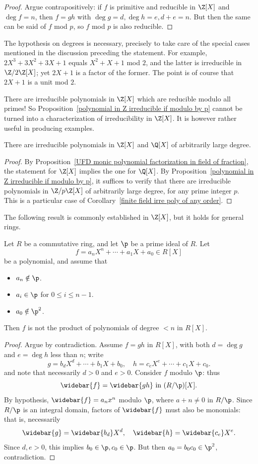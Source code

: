\begin{proof}
Argue contrapositively: if $f$ is primitive and reducible in $\Z[X]$ and $\deg f=n$, then $f=gh$ with $\deg g=d,\deg h=e,d+e=n$. But then the same can be said of $f$ mod $p$, so $f$ mod $p$ is also reducible.
\end{proof}
The hypothesis on degrees is necessary, precisely to take care of the special cases mentioned in the discussion preceding the statement. For example, $2X^3+3X^2+3X+1$ equals $X^2+X+1$ mod $2$, and the latter is irreducible in $\Z/2\Z[X]$; yet $2X+1$ is a factor of the former. The point is of course that $2X+1$ is a unit mod $2$.
\begin{remark}
There are irreducible polynomials in $\Z[X]$ which are reducible modulo all primes! So Proposition~\ref{polynomial in Z irreducible if modulo by p} cannot be turned into a characterization of irreducibility in $\Z[X]$. It is however rather useful in producing examples.
\end{remark}
\begin{corollary}\label{polynomial in Z irreducible degree}
There are irreducible polynomials in $\Z[X]$ and $\Q[X]$ of arbitrarily
large degree.
\end{corollary}
\begin{proof}
By Proposition~\ref{UFD monic polynomial factorization in field of fraction}, the statement for $\Z[X]$ implies the one for $\Q[X]$. By Proposition~\ref{polynomial in Z irreducible if modulo by p}, it suffices to verify that there are irreducible polynomials in $\Z/p\Z[X]$ of arbitrarily large degree, for any prime integer $p$. This is a particular case of Corollary~\ref{finite field irre poly of any order}.
\end{proof}
The following result is commonly established in $\Z[X]$, but it holds for general rings.
\begin{theorem}
Let $R$ be a commutative ring, and let $\p$ be a prime ideal of $R$. Let
\[f=a_nX^n+\cdots+a_1X+a_0\in R[X]\]
be a polynomial, and assume that
\begin{itemize}
\item $a_n\notin\p$.
\item $a_i\in\p$ for $0\leq i\leq n-1$.
\item $a_0\notin\p^2$.
\end{itemize}
Then $f$ is not the product of polynomials of degree $<n$ in $R[X]$.
\end{theorem}
\begin{proof}
Argue by contradiction. Assume $f=gh$ in $R[X]$, with both $d=\deg g$ and $e=\deg h$ less than $n$; write
\[g=b_dX^d+\cdots+b_1X+b_0,\quad h=c_eX^e+\cdots+c_1X+c_0.\]
and note that necessarily $d>0$ and $e>0$. Consider $f$ modulo $\p$: thus
\[\widebar{f}=\widebar{gh}\text{ in }(R/\p)[X].\]
By hypothesis, $\widebar{f}=a_nx^n$ modulo $\p$, where $a+n\neq0$ in $R/\p$. Since $R/\p$ is an integral domain, factors of $\widebar{f}$ must also be monomials: that is, necessarily
\[\widebar{g}=\widebar{b_d}X^d,\quad \widebar{h}=\widebar{c_e}X^e.\]
Since $d,e>0$, this implies $b_0\in\p,c_0\in\p$. But then $a_0=b_0c_0\in\p^2$, contradiction.
\end{proof}
